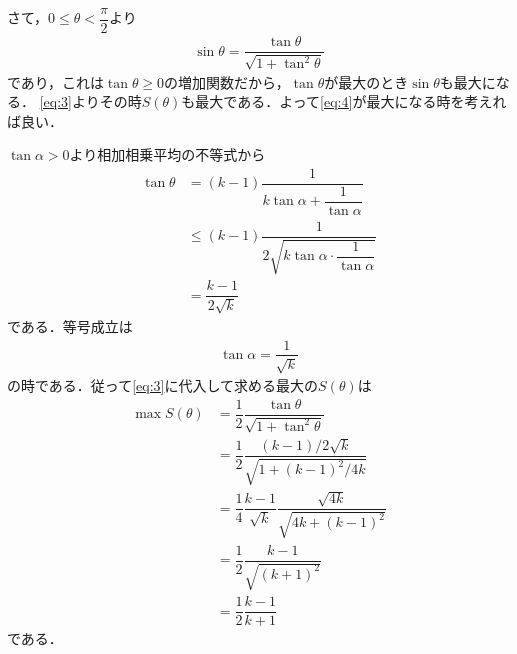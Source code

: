 \documentclass[../../main.tex]{subfiles}
\begin{document}
さて，$0\le\theta<\dfrac{\pi}{2}$より
\begin{align}
  \sin\theta=\dfrac{\tan\theta}{\sqrt{1+\tan^2\theta}}
\end{align}
であり，これは$\tan\theta\ge0$の増加関数だから，$\tan\theta$が最大のとき$\sin\theta$も最大になる．
\cref{eq:3}よりその時$S(\theta)$も最大である．よって\cref{eq:4}が最大になる時を考えれば良い．

$\tan\alpha>0$より相加相乗平均の不等式から
\begin{align}
  \tan\theta
  &= (k-1)\dfrac{1}{k\tan\alpha+\dfrac{1}{\tan\alpha}} \\
  &\le (k-1)\dfrac{1}{2\sqrt{k\tan\alpha\cdot\dfrac{1}{\tan\alpha}}}\\
  & = \dfrac{k-1}{2\sqrt{k}}
\end{align}
である．等号成立は
\begin{align}
  \tan\alpha = \dfrac{1}{\sqrt{k}}
\end{align}
の時である．従って\cref{eq:3}に代入して求める最大の$S(\theta)$は
\begin{align}
  \max S(\theta)
  &= \dfrac{1}{2} \dfrac{\tan\theta}{\sqrt{1+\tan^2\theta}} \\
  &= \dfrac{1}{2} \dfrac{(k-1)/2\sqrt{k}}{\sqrt{1+(k-1)^2/4k}} \\
  &= \dfrac{1}{4} \dfrac{k-1}{\sqrt{k}}\dfrac{\sqrt{4k}}{\sqrt{4k+(k-1)^2}} \\
  &= \dfrac{1}{2} \dfrac{k-1}{\sqrt{(k+1)^2}} \\
  &= \dfrac{1}{2} \dfrac{k-1}{k+1}
\end{align}
である．

\newpage
\end{document}

